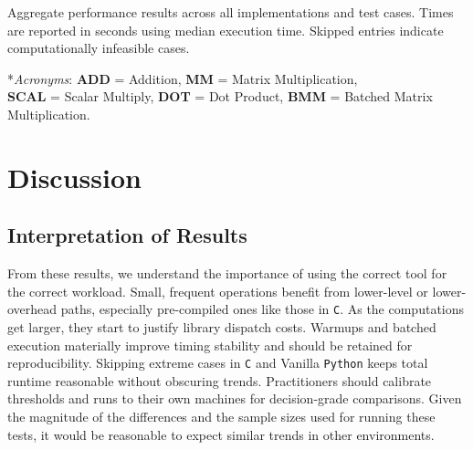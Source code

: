 \documentclass[a4paper,12pt]{article}
\begin{document}
\begin{table}[H]
\caption{Aggregate performance results across all implementations and test cases. Times are reported in seconds using median execution time. Skipped entries indicate computationally infeasible cases.}

\begin{small}
	*\textit{Acronyms}: \hspace{0.5cm}
	\textbf{ADD} = Addition, \hspace{0.5cm} \textbf{MM} = Matrix Multiplication, \hspace{0.5cm} \\ 
	\textbf{SCAL} = Scalar Multiply, \hspace{0.5cm} \textbf{DOT} = Dot Product, \hspace{0.5cm} \textbf{BMM} = Batched Matrix Multiplication.
\end{small}
\end{table}

\section{Discussion}
\subsection{Interpretation of Results}
From these results, we understand the importance of using the correct tool for the correct workload. Small, frequent operations benefit from lower-level or lower-overhead paths, especially pre-compiled ones like those in \texttt{C}. As the computations get larger, they start to justify library dispatch costs. Warmups and batched execution materially improve timing stability and should be retained for reproducibility. Skipping extreme cases in \texttt{C} and Vanilla \texttt{Python} keeps total runtime reasonable without obscuring trends. Practitioners should calibrate thresholds and runs to their own machines for decision-grade comparisons. Given the magnitude of the differences and the sample sizes used for running these tests, it would be reasonable to expect similar trends in other environments.
\end{document}
